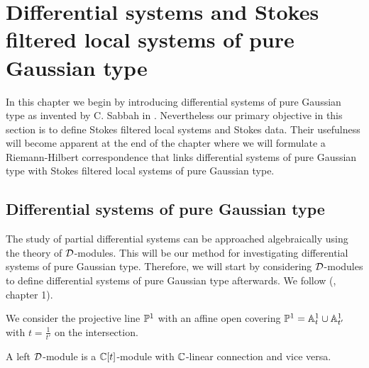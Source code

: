 \chapter{Differential systems and Stokes filtered local systems of pure Gaussian type}

In this chapter we begin by introducing differential systems of pure Gaussian type as invented by C. Sabbah in \cite{Sabbah_2016}. 
Nevertheless our primary objective in this section is to define Stokes filtered local systems and Stokes data. Their usefulness will become apparent at the end of the chapter where we will formulate a Riemann-Hilbert correspondence that links differential systems of pure Gaussian type with Stokes filtered local systems of pure Gaussian type.

\section{Differential systems of pure Gaussian type}\label{DifferentialGauss}

The study of partial differential systems can be approached algebraically using the theory of $\Dc$-modules. This will be our method for investigating differential systems of pure Gaussian type. Therefore, we will start by considering $\Dc$-modules to define differential systems of pure Gaussian type afterwards. We follow (\cite{Sabbah_2016}, chapter 1).
\newline 


We consider the projective line $\P^1$ with an affine open covering $\P^1 = \A^1_t \cup \A^1_{t'}$ with $t = \frac{1}{t'}$ on the intersection.

\begin{lem}\label{module with connection and D module}
A left $\Dc$-module is a $\C[t]$-module with $\C$-linear connection and vice versa.
\end{lem}

